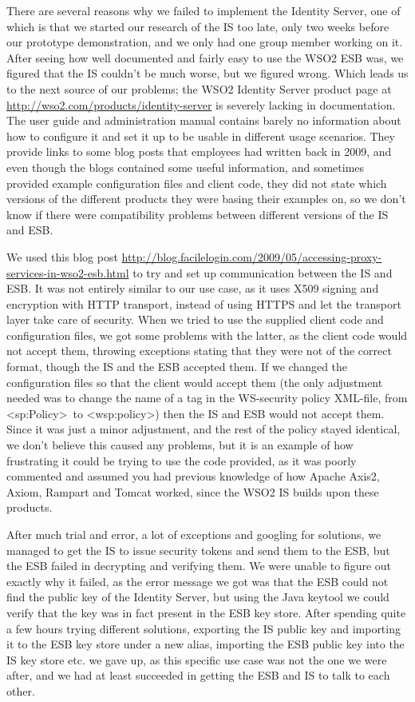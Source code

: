     There are several reasons why we failed to implement the Identity Server, one of which is that we started our research of the IS too late, only two weeks before our prototype demonstration, and we only had one group member working on it. After seeing how well documented and fairly easy to use the WSO2 ESB was, we figured that the IS couldn't be much worse, but we figured wrong. Which leads us to the next source of our problems; the WSO2 Identity Server product page at \url{http://wso2.com/products/identity-server} is severely lacking in documentation. The user guide and administration manual contains barely no information about how to configure it and set it up to be usable in different usage scenarios. They provide links to some blog posts that employees had written back in 2009, and even though the blogs contained some useful information, and sometimes provided example configuration files and client code, they did not state which versions of the different products they were basing their examples on, so we don't know if there were compatibility problems between different versions of the IS and ESB.

    We used this blog post \url{http://blog.facilelogin.com/2009/05/accessing-proxy-services-in-wso2-esb.html} to try and set up communication between the IS and ESB. It was not entirely similar to our use case, as it uses X509 signing and encryption with HTTP transport, instead of using HTTPS and let the transport layer take care of security. When we tried to use the supplied client code and configuration files, we got some problems with the latter, as the client code would not accept them, throwing exceptions stating that they were not of the correct format, though the IS and the ESB accepted them. If we changed the configuration files so that the client would accept them (the only adjustment needed was to change the name of a tag in the WS-security policy XML-file, from \textless sp:Policy\textgreater\ to \textless wsp:policy\textgreater) then the IS and ESB would not accept them. Since it was just a minor adjustment, and the rest of the policy stayed identical, we don't believe this caused any problems, but it is an example of how frustrating it could be trying to use the code provided, as it was poorly commented and assumed you had previous knowledge of how Apache Axis2, Axiom, Rampart and Tomcat worked, since the WSO2 IS builds upon these products.

    After much trial and error, a lot of exceptions and googling for solutions, we managed to get the IS to issue security tokens and send them to the ESB, but the ESB failed in decrypting and verifying them. We were unable to figure out exactly why it failed, as the error message we got was that the ESB could not find the public key of the Identity Server, but using the Java keytool we could verify that the key was in fact present in the ESB key store. After spending quite a few hours trying different solutions, exporting the IS public key and importing it to the ESB key store under a new alias, importing the ESB public key into the IS key store etc. we gave up, as this specific use case was not the one we were after, and we had at least succeeded in getting the ESB and IS to talk to each other.

